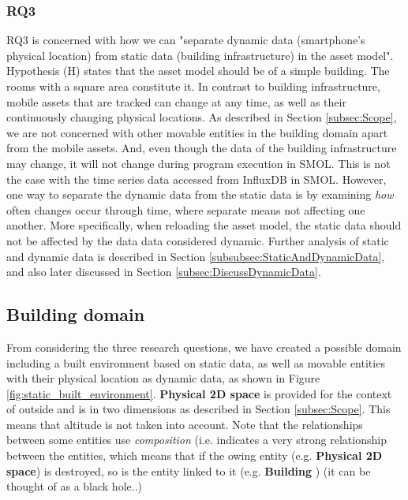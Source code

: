 \documentclass{article}
\begin{document}
\subsubsection{RQ3}
RQ3 is concerned with how we can "separate dynamic data (smartphone’s physical location) from static data
(building infrastructure) in the asset model". Hypothesis (H) states that the asset model should be of a simple building. The rooms with a square area constitute it. In contrast to building infrastructure, mobile assets that are tracked can change at any time, as well as their continuously changing physical locations. As described in Section \ref{subsec:Scope}, we are not concerned with other movable entities in the building domain apart from the mobile assets. And, even though the data of the building infrastructure may change, it will not change during program execution in SMOL. This is not the case with the time series data accessed from InfluxDB in SMOL. However, one way to separate the dynamic data from the static data is by examining \emph{how} often changes occur through time, where separate means not affecting one another. More specifically, when reloading the asset model, the static data should not be affected by the data data considered dynamic. Further analysis of static and dynamic data is described in Section \ref{subsubsec:StaticAndDynamicData}, and also later discussed in Section \ref{subsec:DiscussDynamicData}.
\newline

\subsection{Building domain}\label{subsec:BuildingDomain}
From considering the three research questions, we have created a possible domain including a built environment based on static data, as well as movable entities with their physical location as dynamic data, as shown in Figure \ref{fig:static_built_environment}. \textbf{Physical 2D space} is provided for the context of outside and is in two dimensions as described in Section \ref{subsec:Scope}. This means that altitude is not taken into account. Note that the relationships between some entities use \emph{composition} (i.e. indicates a very strong relationship between the entities, which means that if the owing entity (e.g. \textbf{Physical 2D space}) is destroyed, so is the entity linked to it (e.g. \textbf{Building} \cite{pilone_uml_2005}) (it can be thought of as a black hole..)
\end{document}
